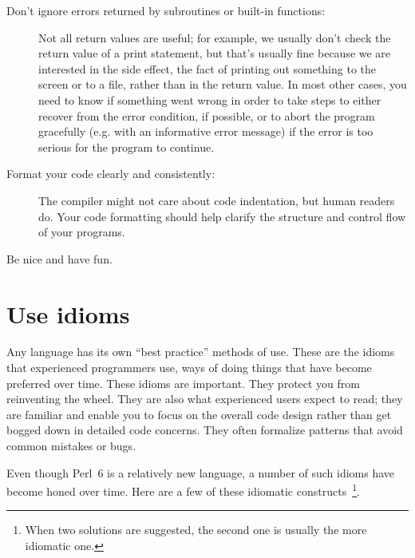\begin{description}
\item[Don't ignore errors returned by subroutines or built-in 
functions:] Not all return values are useful; for example, we 
usually don't check the return value of a print statement, but 
that's usually fine because we are interested in the side effect, 
the fact of printing out something to the screen or to a file, 
rather than in the return value. In most other cases, you need 
to know if something went wrong in order to take steps to either 
recover from the error condition, if possible, or to abort the 
program gracefully (e.g. with an informative error message) if 
the error is too serious for the program to continue.

\item[Format your code clearly and consistently:] The compiler 
might not care about code indentation, but human readers do. 
Your code formatting should help clarify the structure and 
control flow of your programs.

\item[Be nice and have fun.]

\end{description}

\section{Use idioms}

Any language has its own ``best practice'' methods of use. 
These are the idioms that experienced programmers use, ways of doing 
things that have become preferred over time. These idioms are important. 
They protect you from reinventing the wheel. They are also what 
experienced users expect to read; they are familiar 
and enable you to focus on the overall code design rather than
get bogged down in detailed code concerns. They often formalize 
patterns that avoid common mistakes or bugs.

Even though Perl~6 is a relatively new language, a number of such 
idioms have become honed over time. Here are a few of these 
idiomatic constructs~\footnote{When two solutions are suggested, 
the second one is usually the more idiomatic one.}.


